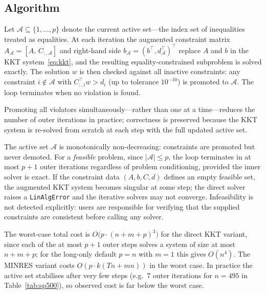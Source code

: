 \documentclass{siam/siamart}
\begin{document}
\subsection{Algorithm}

Let $\mathcal{A} \subseteq \{1,\ldots,p\}$ denote the current active set—the
index set of inequalities treated as equalities.  At each iteration the
augmented constraint matrix $A_{\mathcal{A}} = [A,\, C_{:,\mathcal{A}}]$ and
right-hand side $b_{\mathcal{A}} = (b^\top, d_{\mathcal{A}}^\top)^\top$ replace
$A$ and $b$ in the KKT system~\eqref{eq:kkt}, and the resulting
equality-constrained subproblem is solved exactly.  The solution $w$ is then
checked against all inactive constraints: any constraint $i \notin \mathcal{A}$
with $C_{:,i}^\top w > d_i$ (up to tolerance $10^{-10}$) is promoted to
$\mathcal{A}$.  The loop terminates when no violation is found.

Promoting all violators simultaneously---rather than one at a time---reduces
the number of outer iterations in practice; correctness is preserved because the KKT
system is re-solved from scratch at each step with the full updated active set.

\begin{remark}
The active set $\mathcal{A}$ is monotonically non-decreasing: constraints are promoted
but never demoted.  For a \emph{feasible} problem, since $|\mathcal{A}| \leq p$, the loop
terminates in at most $p + 1$ outer iterations regardless of problem conditioning,
provided the inner solver is exact.  If the constraint data $(A, b, C, d)$ defines an
empty feasible set, the augmented KKT system becomes singular at some step; the direct
solver raises a \texttt{LinAlgError} and the iterative solvers may not converge.
Infeasibility is not detected explicitly: users are responsible for verifying that the
supplied constraints are consistent before calling any solver.

The worst-case total cost is $O\!\bigl(p\cdot(n+m+p)^3\bigr)$ for the direct KKT
variant, since each of the at most $p+1$ outer steps solves a system of size at most
$n + m + p$; for the long-only default $p = n$ with $m = 1$ this gives $O(n^4)$.  The
MINRES variant costs $O(p\cdot k(Tn + mn))$ in the worst case.  In practice the active
set stabilises after very few steps (e.g.\ $7$ outer iterations for $n = 495$ in
Table~\ref{tab:sp500}), so observed cost is far below the worst case.
\end{remark}
\end{document}
